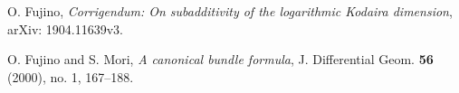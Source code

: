 \documentclass[11pt]{amsart}
\numberwithin{equation}{section}
\theoremstyle{definition}
\theoremstyle{definition}
\theoremstyle{definition}
\begin{document}
\begin{thebibliography}{99}








 O. Fujino, \textit{Corrigendum: On subadditivity of the logarithmic Kodaira dimension}, arXiv: 1904.11639v3.




 O. Fujino and S. Mori, \textit{A canonical bundle formula}, J. Differential Geom. \textbf{56} (2000), no. 1, 167--188.



\end{thebibliography}
\end{document}
